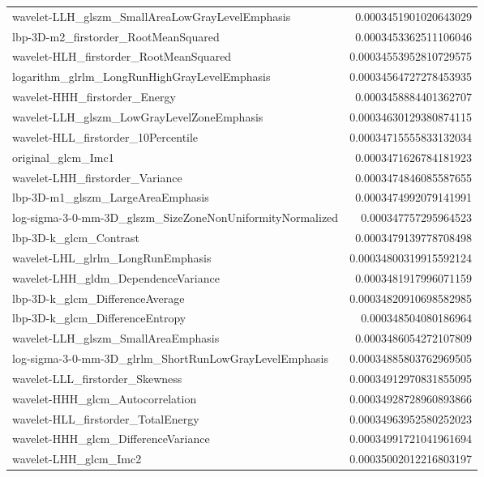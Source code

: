 {\begin{xltabular}[H]{\textwidth}{X r}
        wavelet-LLH\_glszm\_SmallAreaLowGrayLevelEmphasis & 0.0003451901020643029 \\
        lbp-3D-m2\_firstorder\_RootMeanSquared & 0.0003453362511106046 \\
        wavelet-HLH\_firstorder\_RootMeanSquared & 0.00034553952810729575 \\
        logarithm\_glrlm\_LongRunHighGrayLevelEmphasis & 0.00034564727278453935 \\
        wavelet-HHH\_firstorder\_Energy & 0.0003458884401362707 \\
        wavelet-LLH\_glszm\_LowGrayLevelZoneEmphasis & 0.00034630129380874115 \\
        wavelet-HLL\_firstorder\_10Percentile & 0.00034715555833132034 \\
        original\_glcm\_Imc1 & 0.0003471626784181923 \\
        wavelet-LHH\_firstorder\_Variance & 0.0003474846085587655 \\
        lbp-3D-m1\_glszm\_LargeAreaEmphasis & 0.0003474992079141991 \\
        log-sigma-3-0-mm-3D\_glszm\_SizeZoneNonUniformityNormalized & 0.000347757295964523 \\
        lbp-3D-k\_glcm\_Contrast & 0.0003479139778708498 \\
        wavelet-LHL\_glrlm\_LongRunEmphasis & 0.00034800319915592124 \\
        wavelet-LHH\_gldm\_DependenceVariance & 0.0003481917996071159 \\
        lbp-3D-k\_glcm\_DifferenceAverage & 0.00034820910698582985 \\
        lbp-3D-k\_glcm\_DifferenceEntropy & 0.000348504080186964 \\
        wavelet-LLH\_glszm\_SmallAreaEmphasis & 0.0003486054272107809 \\
        log-sigma-3-0-mm-3D\_glrlm\_ShortRunLowGrayLevelEmphasis & 0.00034885803762969505 \\
        wavelet-LLL\_firstorder\_Skewness & 0.00034912970831855095 \\
        wavelet-HHH\_glcm\_Autocorrelation & 0.00034928728960893866 \\
        wavelet-HLL\_firstorder\_TotalEnergy & 0.00034963952580252023 \\
        wavelet-HHH\_glcm\_DifferenceVariance & 0.00034991721041961694 \\
        wavelet-LHH\_glcm\_Imc2 & 0.00035002012216803197 \\

\end{xltabular}}
